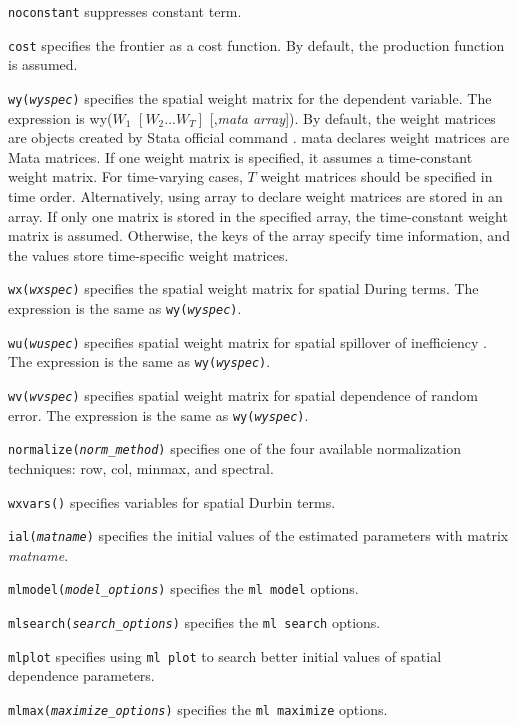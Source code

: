 \hangpara
{\tt noconstant} suppresses constant term.

\hangpara
{\tt cost} specifies the frontier as a cost function. By default, the production function is assumed.

\hangpara
{\tt wy({\it wyspec})} specifies the spatial weight matrix for the dependent variable. The expression is wy($W_1$ $ [W_2 ... W_T]$ [,{\it mata array}]).  By default, the weight matrices are  objects created by Stata official command . mata declares weight matrices are Mata matrices. If one weight matrix is specified, it assumes a time-constant weight matrix. For time-varying cases, $T$ weight matrices should be specified in time order. Alternatively, using array to declare weight matrices are stored in an array.  If only one matrix is stored in the specified array, the time-constant weight matrix is assumed.  Otherwise, the keys of the array specify time information, and the values store time-specific weight matrices.

\hangpara
{\tt wx({\it wxspec})} specifies the spatial weight matrix for spatial During terms. The expression is the same as {\tt wy({\it wyspec})}.

\hangpara
{\tt wu({\it wuspec})} specifies spatial weight matrix for spatial spillover of inefficiency . The expression is the same as {\tt wy({\it wyspec})}.

\hangpara
{\tt wv({\it wvspec})} specifies spatial weight matrix for spatial dependence of random error. The expression is the same as {\tt wy({\it wyspec})}.

\hangpara
{\tt normalize({\it norm\_method})} specifies  one of the four available normalization techniques: row, col, minmax, and spectral.

\hangpara
{\tt wxvars(\varlist)} specifies variables for spatial Durbin terms.


\hangpara
{\tt {}ial({\it matname})} specifies  the initial values of the estimated parameters with matrix {\it matname}.

\hangpara
{\tt mlmodel({\it model\_options})} specifies the  {\tt ml model} options.

\hangpara
{\tt mlsearch({\it search\_options})} specifies the  {\tt ml search} options.

\hangpara
{\tt mlplot} specifies using  {\tt ml plot} to search better initial values of spatial dependence parameters.

\hangpara
{\tt mlmax({\it maximize\_options})} specifies the  {\tt ml maximize} options.

